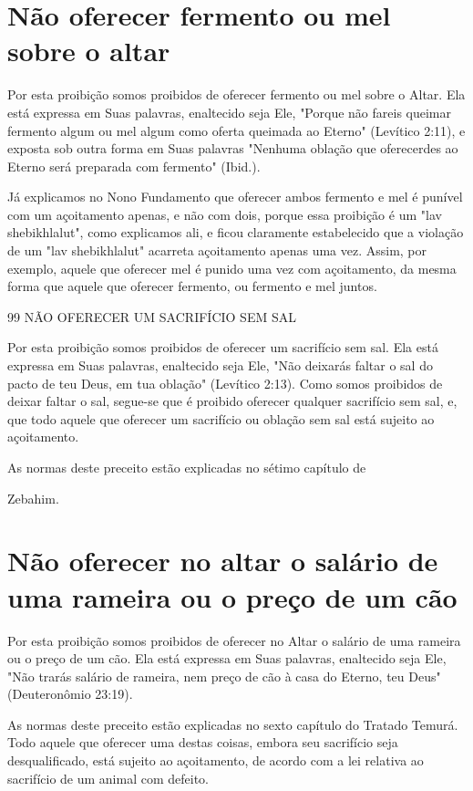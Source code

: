\begin{itemize}
\begin{enumrate}
\begin{itemize}
\begin{itemize}
\begin{itemize}
\section{Não oferecer fermento ou mel sobre o altar}

Por esta proibição somos proibidos de oferecer fermento ou mel so­bre o
Altar. Ela está expressa em Suas palavras, enaltecido seja Ele, "Porque
não fareis queimar fermento algum ou mel algum como oferta queimada ao
Eter­no" (Levítico 2:11), e exposta sob outra forma em Suas palavras
"Nenhuma obla­ção que oferecerdes ao Eterno será preparada com fermento"
(Ibid.).

Já explicamos no Nono Fundamento que oferecer ambos fermento e mel é
punível com um açoitamento apenas, e não com dois, porque essa
proi­bição é um "lav shebikhlalut", como explicamos ali, e ficou
claramente estabe­lecido que a violação de um "lav shebikhlalut"
acarreta açoitamento apenas uma vez. Assim, por exemplo, aquele que
oferecer mel é punido uma vez com açoitamento, da mesma forma que aquele
que oferecer fermento, ou fermento e mel juntos.

99 NÃO OFERECER UM SACRIFÍCIO SEM SAL

Por esta proibição somos proibidos de oferecer um sacrifício sem sal.
Ela está expressa em Suas palavras, enaltecido seja Ele, "Não deixarás
faltar o sal do pacto de teu Deus, em tua oblação" (Levítico 2:13). Como
somos proi­bidos de deixar faltar o sal, segue-se que é proibido
oferecer qualquer sacrifício sem sal, e, que todo aquele que oferecer um
sacrifício ou oblação sem sal está sujeito ao açoitamento.


As normas deste preceito estão explicadas no sétimo capítulo de


Zebahim.


\section{Não oferecer no altar o salário de uma rameira ou o preço de um cão}

Por esta proibição somos proibidos de oferecer no Altar o salário de uma
rameira ou o preço de um cão. Ela está expressa em Suas palavras,
enal­tecido seja Ele, "Não trarás salário de rameira, nem preço de cão à
casa do Eter­no, teu Deus" (Deuteronômio 23:19).

As normas deste preceito estão explicadas no sexto capítulo do Tra­tado
Temurá. Todo aquele que oferecer uma destas coisas, embora seu
sacrifí­cio seja desqualificado, está sujeito ao açoitamento, de acordo
com a lei relati­va ao sacrifício de um animal com defeito.


\end{itemize}
\end{itemize}
\end{itemize}
\end{enumrate}
\end{itemize}
